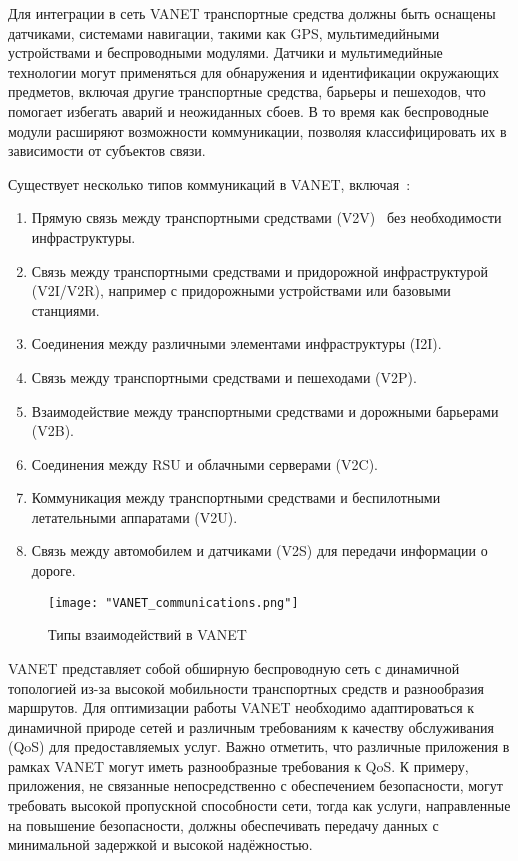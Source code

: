 Для интеграции в сеть VANET транспортные средства должны быть оснащены датчиками, системами навигации, такими как GPS, мультимедийными устройствами и беспроводными модулями. Датчики и мультимедийные технологии могут применяться для обнаружения и идентификации окружающих предметов, включая другие транспортные средства, барьеры и пешеходов, что помогает избегать аварий и неожиданных сбоев. В то время как беспроводные модули расширяют возможности коммуникации, позволяя классифицировать их в зависимости от субъектов связи.

Существует несколько типов коммуникаций в VANET, включая~\cite{daniel2016cooperative}:
\begin{enumerate}
    \item Прямую связь между транспортными средствами (V2V)~\cite{bintoro2021study} без необходимости инфраструктуры.
    \item Связь между транспортными средствами и придорожной инфраструктурой (V2I/V2R), например с придорожными устройствами или базовыми станциями.
    \item Соединения между различными элементами инфраструктуры (I2I).
    \item Связь между транспортными средствами и пешеходами (V2P).
    \item Взаимодействие между транспортными средствами и дорожными барьерами (V2B).
    \item Соединения между RSU и облачными серверами (V2C).
    \item Коммуникация между транспортными средствами и беспилотными летательными аппаратами (V2U).
    \item Связь между автомобилем и датчиками (V2S) для передачи информации о дороге.
\end{enumerate}

\begin{figure}[!h]
    \centering
    \texttt{[image: "VANET\_communications.png"]}
    \caption{Типы взаимодействий в VANET}
    \label{fig:vanet_communications}
\end{figure}

VANET представляет собой обширную беспроводную сеть с динамичной топологией из-за высокой мобильности транспортных средств и разнообразия маршрутов. Для оптимизации работы VANET необходимо адаптироваться к динамичной природе сетей и различным требованиям к качеству обслуживания (QoS) для предоставляемых услуг. Важно отметить, что различные приложения в рамках VANET могут иметь разнообразные требования к QoS. К примеру, приложения, не связанные непосредственно с обеспечением безопасности, могут требовать высокой пропускной способности сети, тогда как услуги, направленные на повышение безопасности, должны обеспечивать передачу данных с минимальной задержкой и высокой надёжностью.

